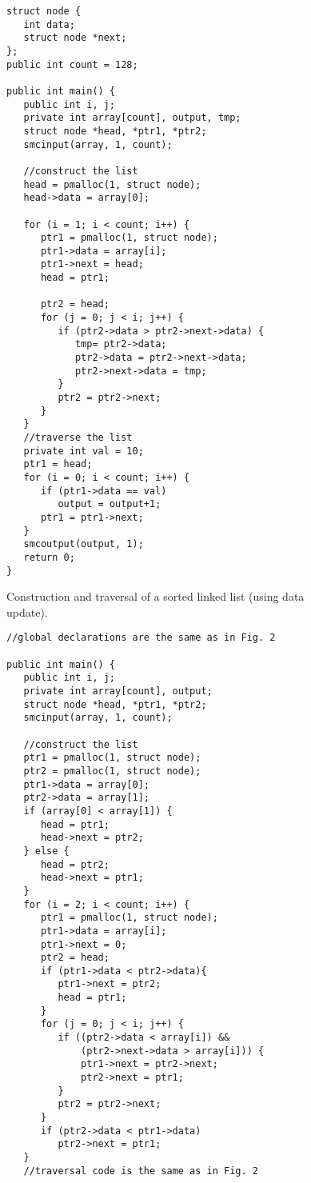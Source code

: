 \documentclass[11pt]{article}
\begin{document}
\begin{enumerate}
\begin{figure}[t!]\small
\begin{verbatim}
struct node {
   int data;
   struct node *next;
};
public int count = 128;

public int main() {
   public int i, j;
   private int array[count], output, tmp;
   struct node *head, *ptr1, *ptr2;
   smcinput(array, 1, count);

   //construct the list
   head = pmalloc(1, struct node);
   head->data = array[0];
    
   for (i = 1; i < count; i++) {
      ptr1 = pmalloc(1, struct node);
      ptr1->data = array[i];
      ptr1->next = head;
      head = ptr1;

      ptr2 = head;
      for (j = 0; j < i; j++) {
         if (ptr2->data > ptr2->next->data) {
            tmp= ptr2->data;
            ptr2->data = ptr2->next->data;
            ptr2->next->data = tmp;
         }
         ptr2 = ptr2->next;
      }
   }
   //traverse the list
   private int val = 10;
   ptr1 = head;
   for (i = 0; i < count; i++) {
      if (ptr1->data == val)
         output = output+1;
      ptr1 = ptr1->next;
   }
   smcoutput(output, 1); 
   return 0; 
}\end{verbatim}
\caption{Construction and traversal of a sorted linked list (using data update).} \label{fig:sl-vu}
\end{figure}

\begin{figure}[h!]\small
\begin{verbatim}
//global declarations are the same as in Fig. 2

public int main() {
   public int i, j;
   private int array[count], output;
   struct node *head, *ptr1, *ptr2;
   smcinput(array, 1, count); 

   //construct the list
   ptr1 = pmalloc(1, struct node);
   ptr2 = pmalloc(1, struct node);
   ptr1->data = array[0];
   ptr2->data = array[1];
   if (array[0] < array[1]) {
      head = ptr1;
      head->next = ptr2;
   } else {
      head = ptr2;
      head->next = ptr1;
   }
   for (i = 2; i < count; i++) {
      ptr1 = pmalloc(1, struct node);
      ptr1->data = array[i];
      ptr1->next = 0;
      ptr2 = head; 
      if (ptr1->data < ptr2->data){
         ptr1->next = ptr2;
         head = ptr1; 
      }      
      for (j = 0; j < i; j++) {
         if ((ptr2->data < array[i]) && 
             (ptr2->next->data > array[i])) {
             ptr1->next = ptr2->next;
             ptr2->next = ptr1;
         }
         ptr2 = ptr2->next;
      }
      if (ptr2->data < ptr1->data)
         ptr2->next = ptr1;
   }
   //traversal code is the same as in Fig. 2


\end{verbatim}
\end{figure}
\end{enumerate}
\end{document}

